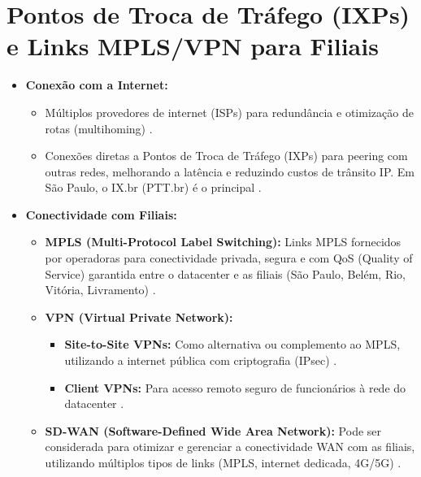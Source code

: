 \documentclass[
	12pt,				%
	oneside,			%
	a4paper,			%
	english,			%
	brazil				%
	]{abntex2unama}
\begin{document}
\section{Pontos de Troca de Tráfego (IXPs) e Links MPLS/VPN para Filiais}
\begin{itemize}
	\item \textbf{Conexão com a Internet:}
	      \begin{itemize}
		      \item Múltiplos provedores de internet (ISPs) para redundância e otimização de rotas (multihoming) \cite{reliability_engineering}.
		      \item Conexões diretas a Pontos de Troca de Tráfego (IXPs) para peering com outras redes, melhorando a latência e reduzindo custos de trânsito IP. Em São Paulo, o IX.br (PTT.br) é o principal \cite{datacenter_networking}.
	      \end{itemize}
	\item \textbf{Conectividade com Filiais:}
	      \begin{itemize}
		      \item \textbf{MPLS (Multi-Protocol Label Switching):} Links MPLS fornecidos por operadoras para conectividade privada, segura e com QoS (Quality of Service) garantida entre o datacenter e as filiais (São Paulo, Belém, Rio, Vitória, Livramento) \cite{network_fabric}.
		      \item \textbf{VPN (Virtual Private Network):}
		            \begin{itemize}
			            \item \textbf{Site-to-Site VPNs:} Como alternativa ou complemento ao MPLS, utilizando a internet pública com criptografia (IPsec) \cite{datacenter_security}.
			            \item \textbf{Client VPNs:} Para acesso remoto seguro de funcionários à rede do datacenter \cite{datacenter_monitoring}.
		            \end{itemize}
		      \item \textbf{SD-WAN (Software-Defined Wide Area Network):} Pode ser considerada para otimizar e gerenciar a conectividade WAN com as filiais, utilizando múltiplos tipos de links (MPLS, internet dedicada, 4G/5G) \cite{software_defined}.
	      \end{itemize}
\end{itemize}
\end{document}
